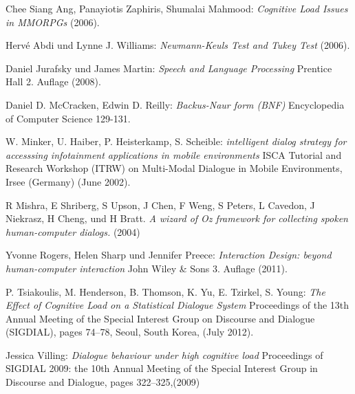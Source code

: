 \documentclass[12pt,a4paper]{scrartcl}
\begin{document}
\newpage
\begin{appendix}


%
%

\begin{thebibliography}{Maron \& Ames, 1982}

	 Chee Siang Ang, Panayiotis Zaphiris, Shumalai Mahmood: \textit{Cognitive Load Issues in MMORPGs} 
(2006).

 Hervé Abdi und Lynne J. Williams: \textit{Newmann-Keuls Test and Tukey Test} 
(2006).

 Daniel Jurafsky und James Martin: \textit{Speech and Language Processing} Prentice Hall 2. Auflage (2008). 


	 Daniel D. McCracken,
Edwin D. Reilly: \textit{Backus-Naur form (BNF)} Encyclopedia of Computer Science 
129-131.


	 W. Minker, U. Haiber, P. Heisterkamp, S. 
Scheible: \textit{intelligent dialog strategy for accesssing infotainment applications in mobile 
environments} ISCA Tutorial and Research Workshop (ITRW) on Multi-Modal Dialogue in Mobile 
Environments, Irsee (Germany) (June 2002).

 R Mishra, E Shriberg, S Upson, J Chen, F Weng, S Peters,
L Cavedon, J Niekrasz, H Cheng, und H Bratt. \textit{A wizard of Oz framework for collecting spoken human-computer dialogs.} (2004)


 Yvonne Rogers, Helen Sharp und Jennifer Preece: \textit{Interaction Design: beyond human-computer interaction} John Wiley \& Sons 3. Auflage (2011). 

	 P. Tsiakoulis, M. Henderson, B. Thomson, K. Yu, E. Tzirkel, S. Young: \textit{The Effect of Cognitive Load on a Statistical Dialogue System} Proceedings of the 13th Annual Meeting of the Special Interest Group on Discourse and Dialogue (SIGDIAL), pages 74–78,
Seoul, South Korea, (July 2012).

 Jessica Villing: \textit{Dialogue behaviour under high cognitive load} Proceedings of SIGDIAL 2009: the 10th Annual Meeting of the Special Interest Group in Discourse and Dialogue, pages 322–325,(2009)




\end{thebibliography}
\end{appendix}
\end{document}
